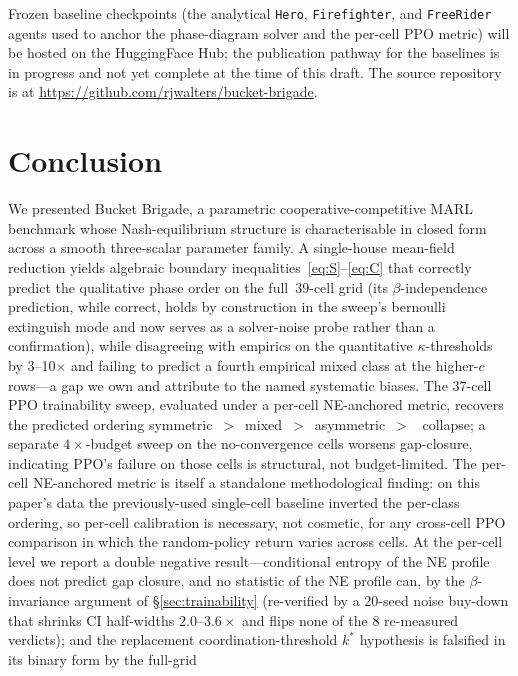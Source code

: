 \documentclass{anvil-paper}
\begin{document}
Frozen baseline checkpoints (the analytical \texttt{Hero},
\texttt{Firefighter}, and \texttt{FreeRider} agents used to anchor the
phase-diagram solver and the per-cell PPO metric) will be hosted on the
HuggingFace Hub; the publication pathway for the baselines is in progress
and not yet complete at the time of this draft. The source repository is at
\url{https://github.com/rjwalters/bucket-brigade}.

\section*{Conclusion}

We presented Bucket Brigade, a parametric cooperative-competitive MARL
benchmark whose Nash-equilibrium structure is characterisable in closed form
across a smooth three-scalar parameter family. A single-house mean-field
reduction yields algebraic boundary inequalities~\eqref{eq:S}--\eqref{eq:C}
that correctly predict the qualitative phase order on the full~$39$-cell
grid (its $\beta$-independence prediction, while correct, holds by
construction in the sweep's bernoulli extinguish mode and now serves as
a solver-noise probe rather than a confirmation), while disagreeing with
empirics on the quantitative
$\kappa$-thresholds by 3--10$\times$ and failing to predict a fourth
empirical \textsf{mixed} class at the higher-$c$ rows---a gap we own and
attribute to the named systematic biases. The $37$-cell PPO trainability
sweep, evaluated under a per-cell NE-anchored metric, recovers the
predicted ordering
\textsf{symmetric}~$>$~\textsf{mixed}~$>$~\textsf{asymmetric}~$>$~%
\textsf{collapse}; a separate $4{\times}$-budget sweep on the
no-convergence cells worsens gap-closure, indicating PPO's failure on those
cells is structural, not budget-limited. The per-cell NE-anchored metric is itself a
standalone methodological finding: on this paper's data the previously-used
single-cell baseline inverted the per-class ordering, so per-cell
calibration is necessary, not cosmetic, for any cross-cell PPO comparison
in which the random-policy return varies across cells. At the per-cell
level we report a double negative result---conditional entropy of the
NE profile does not predict gap closure, and no statistic of the NE
profile can, by the $\beta$-invariance argument of
\S\ref{sec:trainability} (re-verified by a $20$-seed noise buy-down
that shrinks CI half-widths $2.0$--$3.6{\times}$ and flips none of the
$8$ re-measured verdicts); and the replacement coordination-threshold
$k^{*}$ hypothesis is falsified in its binary form by the full-grid
\end{document}
